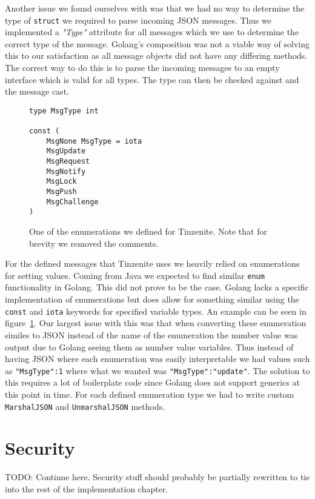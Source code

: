 Another issue we found ourselves with was that we had no way to determine the type of \texttt{struct} we required to parse incoming JSON messages.
Thus we implemented a \textit{"Type"} attribute for all messages which we use to determine the correct type of the message.
Golang's composition was not a viable way of solving this to our satisfaction as all message objects did not have any differing methods.
The correct way to do this is to parse the incoming messages to an empty interface which is valid for all types.
The type can then be checked against and the message cast.

\begin{figure}[htp]
    \begin{lstlisting}[language=golang,firstnumber=0]
type MsgType int

const (
	MsgNone MsgType = iota
	MsgUpdate
	MsgRequest
	MsgNotify
	MsgLock
	MsgPush
	MsgChallenge
)
    \end{lstlisting}
\caption[Golang Enum Example]{One of the enumerations we defined for Tinzenite. Note that for brevity we removed the comments.}
\label{golang:enum_example}
\end{figure}

For the defined messages that Tinzenite uses we heavily relied on enumerations for setting values.
Coming from Java we expected to find similar \texttt{enum} functionality in Golang.
This did not prove to be the case.
Golang lacks a specific implementation of enumerations but does allow for something similar using the \texttt{const} and \texttt{iota} keywords for specified variable types.
An example can be seen in figure~\ref{golang:enum_example}.
Our largest issue with this was that when converting these enumeration similes to JSON instead of the name of the enumeration the number value was output due to Golang seeing them as number value variables.
Thus instead of having JSON where each enumeration was easily interpretable we had values such as \texttt{"MsgType":1} where what we wanted was \texttt{"MsgType":"update"}.
The solution to this requires a lot of boilerplate code since Golang does not support generics at this point in time.
For each defined enumeration type we had to write custom \texttt{MarshalJSON} and \texttt{UnmarshalJSON} methods.

\section{Security}
\label{sec:Security}

TODO: Continue here.
Security stuff should probably be partially rewritten to tie into the rest of the implementation chapter.

